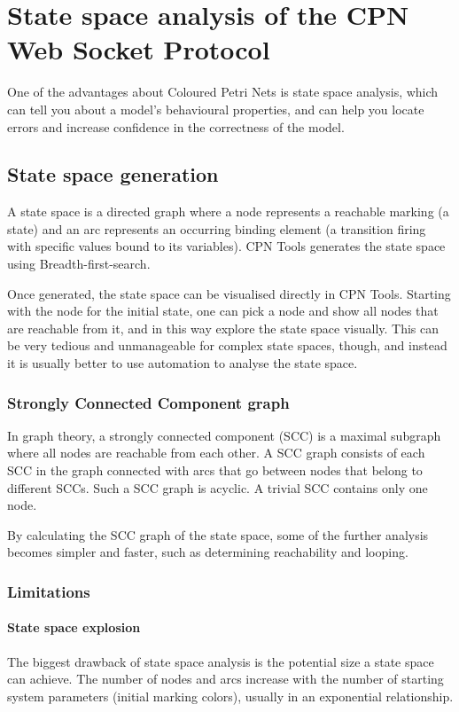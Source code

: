 \chapter{State space analysis of the CPN Web Socket Protocol}
\label{chap:statespace}

One of the advantages about Coloured Petri Nets is state space analysis, which
can tell you about a model's behavioural properties, and can help you locate
errors and increase confidence in the correctness of the model.

\section{State space generation}
A state space is a directed graph where a node represents a reachable marking (a
state) and an arc represents an occurring binding element (a transition firing
with specific values bound to its variables). CPN Tools generates the state
space using Breadth-first-search. 

Once generated, the state space can be visualised directly in CPN Tools.
Starting with the node for the initial state, one can pick a node and show all
nodes that are reachable from it, and in this way explore the state space
visually. This can be very tedious and unmanageable for complex state spaces,
though, and instead it is usually better to use automation to analyse the state
space.

	\subsection{Strongly Connected Component graph}
	In graph theory, a strongly connected component (SCC) is a maximal subgraph
	where all nodes are reachable from each other. A SCC graph consists of each
	SCC in the graph connected with arcs that go between nodes that belong to
	different SCCs. Such a SCC graph is acyclic. A trivial SCC contains only one
	node.
	
	By calculating the SCC graph of the state space, some of the further
	analysis becomes simpler and faster, such as determining reachability and
	looping.

	\subsection{Limitations}
		\subsubsection{State space explosion}
		The biggest drawback of state space analysis is the potential size a state space
		can achieve. The number of nodes and arcs increase with the number of starting
		system parameters (initial marking colors), usually in an exponential relationship. 
		
